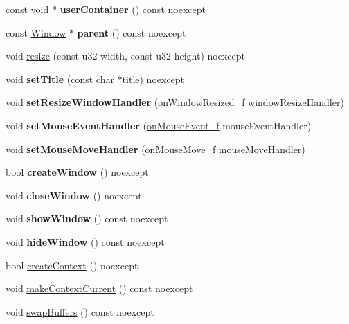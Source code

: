 \begin{DoxyCompactItemize}
\item 
\mbox{\label{class_window_a6f48fd801b74b3894d6aef42dd65c24b}} 
const void $\ast$ {\bfseries user\+Container} () const noexcept
\item 
\mbox{\label{class_window_a3e379ed7a8891981f98d1cd46ec21e01}} 
const \mbox{\hyperlink{class_window}{Window}} $\ast$ {\bfseries parent} () const noexcept
\item 
void \mbox{\hyperlink{class_window_ad465b342c02505c01f38afa99d7fcbfe}{resize}} (const u32 width, const u32 height) noexcept
\item 
\mbox{\label{class_window_a1d3b5b6ac567d76dddab35bcf318890f}} 
void {\bfseries set\+Title} (const char $\ast$title) noexcept
\item 
\mbox{\label{class_window_a835e14bb4349d7ee0a32bdb0dfa8fec3}} 
void {\bfseries set\+Resize\+Window\+Handler} (\mbox{\hyperlink{_window_8hpp_a6849c0abbb7ea93481de9f39ddaf5c79}{on\+Window\+Resized\+\_\+f}} window\+Resize\+Handler)
\item 
\mbox{\label{class_window_af0f2b7177136feda401590a6ec81f73a}} 
void {\bfseries set\+Mouse\+Event\+Handler} (\mbox{\hyperlink{_window_8hpp_ad1980bd4a8619653dab87e3d48f94780}{on\+Mouse\+Event\+\_\+f}} mouse\+Event\+Handler)
\item 
\mbox{\label{class_window_a5641f98b1f9c66ecc28d800a7b9013d2}} 
void {\bfseries set\+Mouse\+Move\+Handler} (on\+Mouse\+Move\+\_\+f mouse\+Move\+Handler)
\item 
\mbox{\label{class_window_a81dbff4890442cf1dae94ab22456a716}} 
bool {\bfseries create\+Window} () noexcept
\item 
\mbox{\label{class_window_af146894ca4abaf77d748224ca3765270}} 
void {\bfseries close\+Window} () noexcept
\item 
\mbox{\label{class_window_a5dc19c7cdd7c781005437eb2a55acef9}} 
void {\bfseries show\+Window} () const noexcept
\item 
\mbox{\label{class_window_a8ff16f15c65deb37e44fd1b882e37289}} 
void {\bfseries hide\+Window} () const noexcept
\item 
bool \mbox{\hyperlink{class_window_ae8f88271d37b496acde43280b8e7d99c}{create\+Context}} () noexcept
\item 
void \mbox{\hyperlink{class_window_ab217dfd20f30652a98647fec702a55a5}{make\+Context\+Current}} () const noexcept
\item 
void \mbox{\hyperlink{class_window_a838a9d28972c2c05b22ec5424a97b6b9}{swap\+Buffers}} () const noexcept
\end{DoxyCompactItemize}

